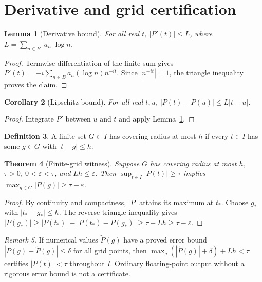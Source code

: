 \documentclass[11pt]{article}
\newtheorem{theorem}{Theorem}[section]
\newtheorem{lemma}[theorem]{Lemma}
\newtheorem{corollary}[theorem]{Corollary}
\theoremstyle{definition}\newtheorem{definition}[theorem]{Definition}
\theoremstyle{remark}\newtheorem{remark}[theorem]{Remark}
\begin{document}
\section{Derivative and grid certification}
\begin{lemma}[Derivative bound]\label{derivative}
For all real $t$, $|P'(t)|\le L$, where $L=\sum_{n\in B}|a_n|\log n$.
\end{lemma}
\begin{proof}
Termwise differentiation of the finite sum gives $P'(t)=-i\sum_{n\in B}a_n(\log n)n^{-it}$. Since $|n^{-it}|=1$, the triangle inequality proves the claim.
\end{proof}
\begin{corollary}[Lipschitz bound]
For all real $t,u$, $|P(t)-P(u)|\le L|t-u|$.
\end{corollary}
\begin{proof}Integrate $P'$ between $u$ and $t$ and apply Lemma~\ref{derivative}.\end{proof}
\begin{definition}A finite set $G\subset I$ has covering radius at most $h$ if every $t\in I$ has some $g\in G$ with $|t-g|\le h$.\end{definition}
\begin{theorem}[Finite-grid witness]
Suppose $G$ has covering radius at most $h$, $\tau>0$, $0<\varepsilon<\tau$, and $Lh\le\varepsilon$. Then $\sup_{t\in I}|P(t)|\ge\tau$ implies $\max_{g\in G}|P(g)|\ge\tau-\varepsilon$.
\end{theorem}
\begin{proof}
By continuity and compactness, $|P|$ attains its maximum at $t_*$. Choose $g_*$ with $|t_*-g_*|\le h$. The reverse triangle inequality gives $|P(g_*)|\ge |P(t_*)|-|P(t_*)-P(g_*)|\ge\tau-Lh\ge\tau-\varepsilon$.
\end{proof}
\begin{remark}If numerical values $\widetilde P(g)$ have a proved error bound $|P(g)-\widetilde P(g)|\le\delta$ for all grid points, then $\max_g(|\widetilde P(g)|+\delta)+Lh<\tau$ certifies $|P(t)|<\tau$ throughout $I$. Ordinary floating-point output without a rigorous error bound is not a certificate.\end{remark}
\end{document}
